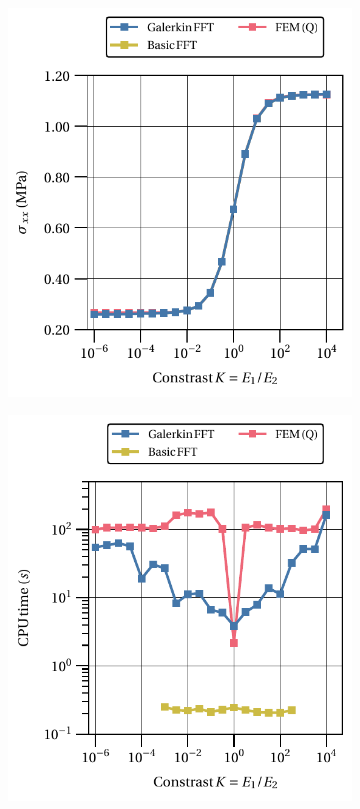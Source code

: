 \begin{figure}[hbt]
  \centering
  	\begin{subfigure}[b]{0.49\textwidth}
      \centering
      \includegraphics[width=\textwidth]{figures/linear_2D_normal_stress_avg_vs_stiff_ratio}
      \caption{}
      \label{subfig:linear_2D_normal_stress_avg_vs_stiff_ratio}
    \end{subfigure}
    \begin{subfigure}[b]{0.49\textwidth}
      \centering
      \includegraphics[width=\textwidth]{figures/linear_2D_normal_stress_avg_cpu_time_vs_n_voxels}

\end{subfigure}
\end{figure}
